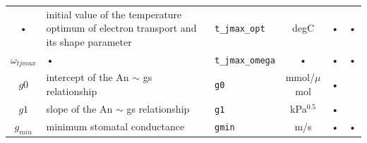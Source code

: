 \begin{table}
\begin{tabularx}{\linewidth}{|c|X|l|c|c|c|}
 • & initial value of the temperature optimum of electron transport and its shape parameter & \texttt{t\_jmax\_opt} & degC & • & • \\
$\omega_{t jmax}$ & • & \texttt{t\_jmax\_omega} & • & • & • \\
$g0$ & intercept of the An $\sim$ gs relationship & \texttt{g0} & mmol/$\mu$mol & • & \\
$g1$ & slope of the An $\sim$ gs relationship & \texttt{g1} & kPa$^{0.5}$ & • & \cite{Lin:2015er} \\
$g_{min}$ & minimum stomatal conductance & \texttt{gmin} & m/s & • & • \\
\hline 
\end{tabularx}
\end{table}



